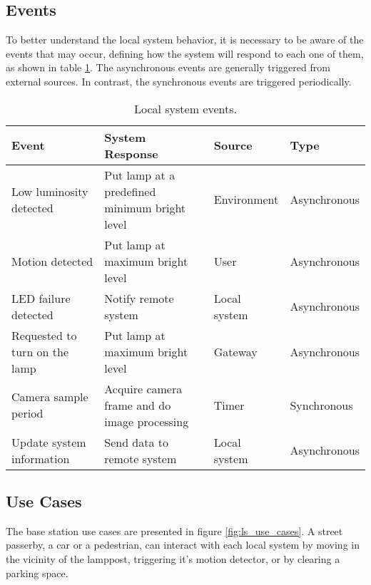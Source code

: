 \subsection{Events}
To better understand the local system behavior, it is necessary to be aware of the events that may occur, defining how the system will respond to each one of them, as shown in table \ref{table:ls_events}. The asynchronous events are generally triggered from external sources. In contrast, the synchronous events are triggered periodically.

\begin{table}[ht]
	\centering
	\resizebox{\columnwidth}{!}
	{

	\begin{tabular}{|m{3cm}|m{5cm}|m{2.4cm}|m{2.4cm}|}
		\hline
		\textbf{Event} & \textbf{System Response} & \textbf{Source} & \textbf{Type}\\
		\hline\hline
		Low luminosity detected & Put lamp at a predefined minimum bright level & Environment & Asynchronous\\
		\hline
		
		Motion detected & Put lamp at maximum bright level & User & Asynchronous\\
		\hline
		
		LED failure detected & Notify remote system & Local system & Asynchronous\\
		\hline
		
		Requested to turn on the lamp & Put lamp at maximum bright level & Gateway & Asynchronous\\
		\hline
		
		Camera sample period & Acquire camera frame and do image processing & Timer & Synchronous\\
		\hline
		
		
		Update system information & Send data to remote system & Local system & Asynchronous\\
		\hline
	\end{tabular}
	}		
	\caption{Local system events.}
	\label{table:ls_events}
\end{table}

\subsection{Use Cases}
The base station use cases are presented in figure \ref{fig:ls_use_cases}. A street passerby, a car or a pedestrian, can interact with each local system by moving in the vicinity of the lamppost, triggering it's motion detector, or by clearing a parking space.

